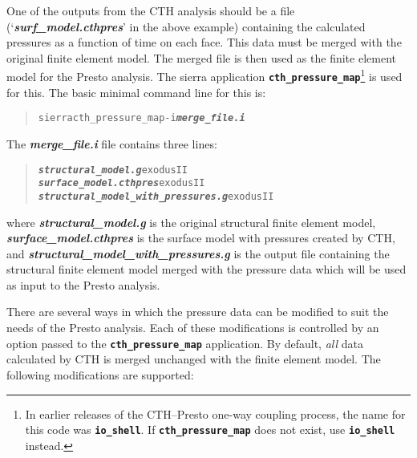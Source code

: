 \documentclass[11pt,twoside]{article}
\newcommand{\code}[1]
   {\mbox{\bf\tt #1}\null}
\newcommand{\file}[1]
   {\mbox{\bf\em #1}\null}
\newenvironment{source}
{\small\begin{quote}\begin{alltt}}
{\end{alltt}\end{quote}\normalsize}
\begin{document}
One of the outputs from the CTH analysis should be a file
(`\file{surf\_model.cthpres}' in the above example) containing the calculated
pressures as a function of time on each face.  This data must be
merged with the original finite element model.  The merged file is
then used as the finite element model for the Presto analysis.  The sierra application
\code{cth\_pressure\_map}\footnote{In earlier releases of the
CTH--Presto one-way coupling process, the name for this code was
\code{io\_shell}. If \code{cth\_pressure\_map} does not exist, use
\code{io\_shell} instead.} is used for this.  The basic minimal
command line for this is:
\begin{source}
sierra cth\_pressure\_map {-}i \file{merge\_file.i} 
\end{source}
The \file{merge\_file.i} file contains three lines:
\begin{source}
\file{structural\_model.g} exodusII
\file{surface\_model.cthpres} exodusII
\file{structural\_model\_with\_pressures.g} exodusII
\end{source}
where \file{structural\_model.g} is the original structural finite element
model, \file{surface\_model.cthpres} is the surface model with pressures
created by CTH, and \file{structural\_model\_with\_pressures.g} is the
output file containing the structural finite element model merged with
the pressure data which will be used as input to the Presto analysis.

There are several ways in which the pressure data can be modified to
suit the needs of the Presto analysis.  Each of these modifications is
controlled by an option passed to the \code{cth\_pressure\_map} application.  By
default, \textit{all} data calculated by CTH is merged unchanged with
the finite element model.  The following modifications are supported:
\end{document}
